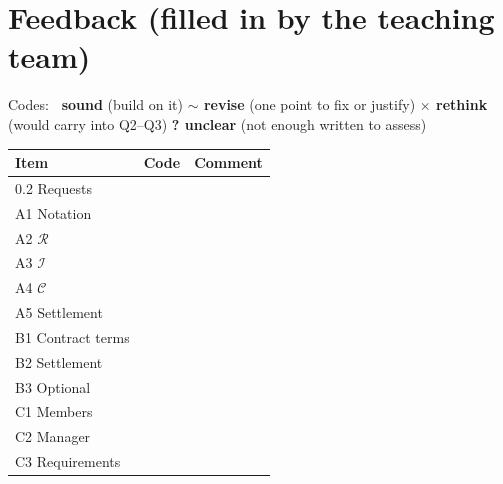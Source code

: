 \documentclass[10pt,a4paper]{article}
\newcommand{\cR}{\mathcal{R}}
\newcommand{\cI}{\mathcal{I}}
\newcommand{\cC}{\mathcal{C}}
\begin{document}
\clearpage
\section*{Feedback (filled in by the teaching team)}

Codes: {\color{fbgreen}\textbf{\checkmark\ sound}} (build on it) \quad
{\color{orange!70!black}\textbf{$\sim$ revise}} (one point to fix or justify) \quad
{\color{dtured}\textbf{$\times$ rethink}} (would carry into Q2--Q3) \quad
{\color{black!55}\textbf{? unclear}} (not enough written to assess)

\renewcommand{\arraystretch}{1.6}
\begin{tabularx}{\linewidth}{@{}l c X@{}}
\toprule
Item & Code & Comment \\
\midrule
0.2 Requests & & \\
A1 Notation & & \\
A2 $\cR$ & & \\
A3 $\cI$ & & \\
A4 $\cC$ & & \\
A5 Settlement & & \\
B1 Contract terms & & \\
B2 Settlement & & \\
B3 Optional & & \\
C1 Members & & \\
C2 Manager & & \\
C3 Requirements & & \\
\bottomrule
\end{tabularx}
\end{document}
